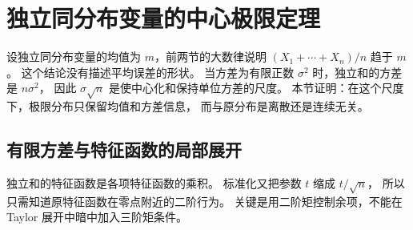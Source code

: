 \section{独立同分布变量的中心极限定理}
\label{b1:sec:3007}

设独立同分布变量的均值为 \(m\)，前两节的大数律说明
\((X_1+\cdots+X_n)/n\) 趋于 \(m\)。
这个结论没有描述平均误差的形状。
当方差为有限正数 \(\sigma^2\) 时，独立和的方差是 \(n\sigma^2\)，
因此 \(\sigma\sqrt n\) 是使中心化和保持单位方差的尺度。
本节证明：在这个尺度下，极限分布只保留均值和方差信息，
而与原分布是离散还是连续无关。

\subsection{有限方差与特征函数的局部展开}
\label{b1:subsec:300701}

独立和的特征函数是各项特征函数的乘积。
标准化又把参数 \(t\) 缩成 \(t/\sqrt n\)，
所以只需知道原特征函数在零点附近的二阶行为。
关键是用二阶矩控制余项，不能在 Taylor 展开中暗中加入三阶矩条件。

